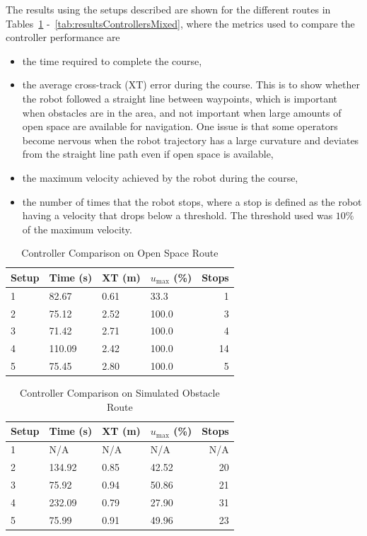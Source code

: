 The results using the setups described are shown for the different routes in Tables~\ref{tab:resultsControllersOpenSpace} -~\ref{tab:resultsControllersMixed}, where the metrics used to compare the controller performance are
\begin{itemize}
\item the time required to complete the course,
\item the average cross-track (XT) error during the course. This is to show whether the robot followed a straight line between waypoints, which is important when obstacles are in the area, and not important when large amounts of open space are available for navigation. One issue is that some operators become nervous when the robot trajectory has a large curvature and deviates from the straight line path even if open space is available,
\item the maximum velocity achieved by the robot during the course,
\item the number of times that the robot stops, where a stop is defined as the robot having a velocity that drops below a threshold. The threshold used was $10\%$ of the maximum velocity.
\end{itemize}

\begin{table}[ht!]
\caption{Controller Comparison on Open Space Route}
\small
\centering
\begin{tabular}{@{}llllr@{}} \toprule
Setup & Time (s) & XT (m) & $u_{\text{max}}$ (\%) & Stops \\ \midrule
1     & 82.67    & 0.61   & 33.3                  & 1     \\
2     & 75.12    & 2.52   & 100.0                 & 3     \\
3     & 71.42    & 2.71   & 100.0                 & 4     \\
4     & 110.09   & 2.42   & 100.0                 & 14    \\
5     & 75.45    & 2.80   & 100.0                 & 5     \\ \bottomrule
\end{tabular}
\label{tab:resultsControllersOpenSpace}
\end{table}

\begin{table}[ht!]
\caption{Controller Comparison on Simulated Obstacle Route}
\small
\centering
\begin{tabular}{@{}llllr@{}} \toprule
Setup & Time (s) & XT (m) & $u_{\text{max}}$ (\%) & Stops \\ \midrule
1     & N/A      & N/A    & N/A                   & N/A   \\
2     & 134.92   & 0.85   & 42.52                 & 20    \\
3     & 75.92    & 0.94   & 50.86                 & 21    \\
4     & 232.09   & 0.79   & 27.90                 & 31    \\
5     & 75.99    & 0.91   & 49.96                 & 23    \\ \bottomrule
\end{tabular}
\label{tab:resultsControllersObstacles}
\end{table}

